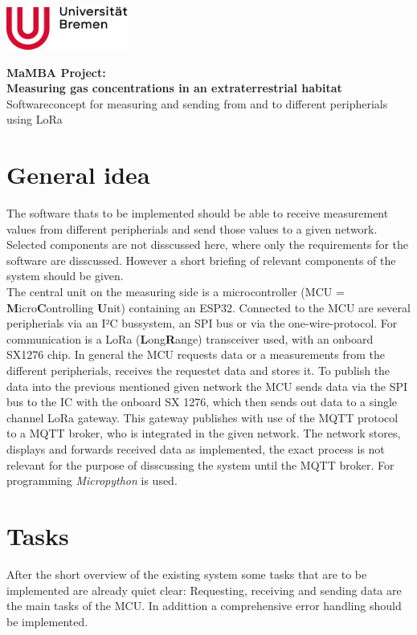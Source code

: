 \documentclass[a4paper, 12pt]{article}
\begin{document}
\begin{multicols}{2}
\includegraphics[width=0.3\textwidth]{bilder/Uni-Bremen_Logo.png}
\\
\end{multicols}
\begin{center}
{\LARGE\bfseries MaMBA Project:\\Measuring gas concentrations in an extraterrestrial habitat}
\\
{\Large Softwareconcept for measuring and sending from and to different peripherials using LoRa}
\end{center}

\section{General idea}
The software thats to be implemented should be able to receive measurement values from different peripherials and send those values to a given network. Selected components are not disscussed here, where only the requirements for the software are disscussed. However a short briefing of relevant components of the system should be given.\\
The central unit on the measuring side is a microcontroller (MCU = \textbf{M}icro\textbf{C}ontrolling \textbf{U}nit) containing an ESP32. Connected to the MCU are several peripherials via an I²C bussystem, an SPI bus or via the one-wire-protocol. For communication is a LoRa (\textbf{L}ong\textbf{R}ange) transceiver used, with an onboard SX1276 chip. In general the MCU requests data or a measurements from the different peripherials, receives the requestet data and stores it. To publish the data into the previous mentioned given network the MCU sends data via the SPI bus to the IC with the onboard SX 1276, which then sends out data to a single channel LoRa gateway. This gateway publishes with use of the MQTT protocol to a MQTT broker, who is integrated in the given network. The network stores, displays and forwards received data as implemented, the exact process is not relevant for the purpose of disscussing the system until the MQTT broker. For programming \textit{Micropython} is used.
 
\section{Tasks}
After the short overview of the existing system some tasks that are to be implemented are already quiet clear: Requesting, receiving and sending data are the main tasks of the MCU. In addittion a comprehensive error handling should be implemented.
\end{document}

